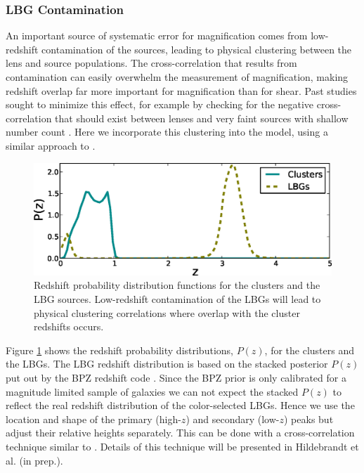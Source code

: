 \subsubsection{LBG Contamination}
\label{contam}
An important source of systematic error for magnification comes from low-redshift contamination of the sources, leading to physical clustering between the lens and source populations. The cross-correlation that results from contamination can easily overwhelm the measurement of magnification, making redshift overlap far more important for magnification than for shear. Past studies sought to minimize this effect, for example by checking for the negative cross-correlation that should exist between lenses and very faint sources with shallow number count \citep{Ford12, Hildebrandt09b}. Here we incorporate this clustering into the model, using a similar approach to \citet{Hildebrandt13}.

\begin{figure}
\begin{center}
\includegraphics[scale=0.7]{plots_ch3/PofZ_clustersNudrops.eps}
\caption[Redshift Distributions of Clusters and Sources]{Redshift probability distribution functions for the clusters and the LBG sources. Low-redshift contamination of the LBGs will lead to physical clustering correlations where overlap with the cluster redshifts occurs.}
\label{pofz}
\end{center}
\end{figure}

Figure \ref{pofz} shows the redshift probability distributions, $P(z)$, for the clusters and the LBGs. The LBG redshift distribution is based on the stacked posterior $P(z)$ put out by the BPZ redshift code \citep[for details on the CFHTLenS photo-$z$ see][]{Hildebrandt12}. Since the BPZ prior is only calibrated for a magnitude limited sample of galaxies we can not expect the stacked $P(z)$ to reflect the real redshift distribution of the color-selected LBGs. Hence we use the location and shape of the primary (high-$z$) and secondary (low-$z$) peaks but adjust their relative heights separately. This can be done with a cross-correlation technique similar to \citet{Newman08}. Details of this technique will be presented in Hildebrandt et al. (in prep.).

